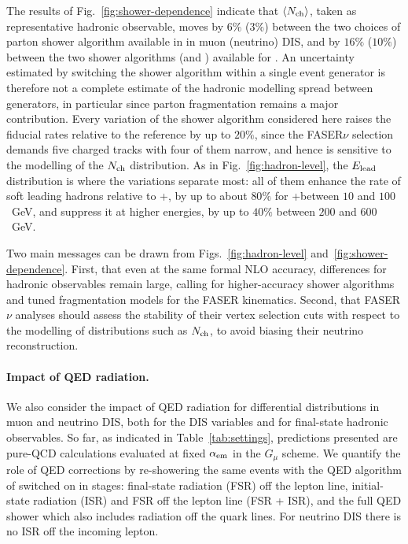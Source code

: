 The results of Fig.~\ref{fig:shower-dependence} indicate that $\left\langle N_{\rm ch}\right\rangle$, taken as representative hadronic observable,  moves by $6\%$ ($3\%$) between the two choices of parton shower algorithm available in \sherpa in muon (neutrino) DIS, and by $16\%$ ($10\%$) between the two shower algorithms (\pythia and \herwig) available for \powheg.
%
An uncertainty estimated by switching the shower algorithm within a single event generator is therefore not a complete estimate of the hadronic modelling spread between generators, in particular since parton fragmentation remains a major contribution.
%
Every variation of the  shower algorithm considered here raises the fiducial rates relative to the \powheg reference by up to $20\%$, since the FASER$\nu$ selection demands five charged tracks with four of them narrow, and hence is sensitive to the modelling of the $N_{\rm ch}$ distribution. 
%
As in Fig.~\ref{fig:hadron-level}, the $E_{\rm lead}$ distribution is where the variations separate most: all of them enhance the rate of soft leading hadrons relative to \powheg{}+\pythia, by up to about $80\%$ for \powheg{}+\herwig between $10$ and $100$~GeV, and suppress it at higher energies, by up to $40\%$ between $200$ and $600$~GeV.


Two main messages can be drawn from Figs.~\ref{fig:hadron-level} and~\ref{fig:shower-dependence}.
%
First, that even at the same formal NLO accuracy, differences for hadronic observables remain large, calling for higher-accuracy shower algorithms and tuned fragmentation models for the FASER kinematics.
%
Second, that FASER$\nu$ analyses should assess the stability of their vertex selection cuts with respect to the modelling of distributions such as $N_{\rm ch}$, to avoid biasing their neutrino reconstruction. 

\paragraph{Impact of QED radiation.}
%
We also consider the impact of QED radiation for differential distributions in muon and neutrino DIS, both for the DIS variables and for final-state hadronic observables.
%
So far, as indicated in Table~\ref{tab:settings}, predictions presented are pure-QCD calculations evaluated at fixed $\alpha_{\rm em}$ in the $G_\mu$ scheme.
%
We quantify the role of QED corrections by re-showering the same \powheg events with the QED algorithm of \pythia switched on in stages: final-state radiation (FSR) off the lepton line, initial-state radiation (ISR) and FSR off the lepton line (FSR + ISR), and the full QED shower which also includes radiation off the quark lines.
%
For neutrino DIS there is no ISR off the incoming lepton.

